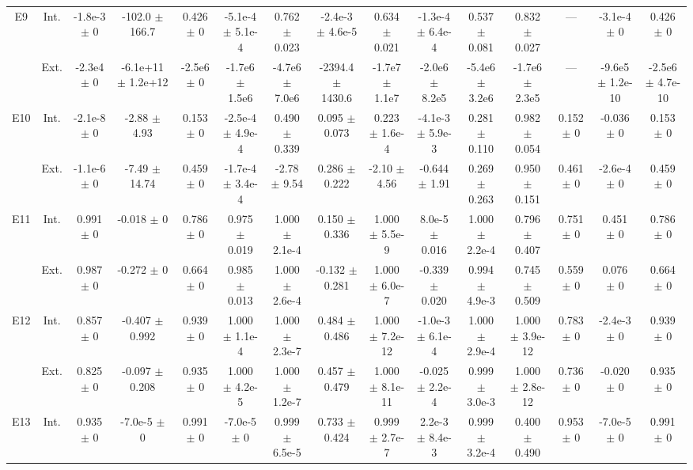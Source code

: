 \begin{table}[htbp]
{\begin{tabular}{@{}ccccccccccccccc@{}}
\cline{2-15}
\multirow{2}{*}{E9} & Int. & -1.8e-3 $\pm$ 0 & -102.0 $\pm$ 166.7 & 0.426 $\pm$ 0 & -5.1e-4 $\pm$ 5.1e-4 & 0.762 $\pm$ 0.023 & -2.4e-3 $\pm$ 4.6e-5 & 0.634 $\pm$ 0.021 & -1.3e-4 $\pm$ 6.4e-4 & 0.537 $\pm$ 0.081 & 0.832 $\pm$ 0.027 & --- & -3.1e-4 $\pm$ 0 & 0.426 $\pm$ 0 \\
 & Ext. & -2.3e4 $\pm$ 0 & -6.1e+11 $\pm$ 1.2e+12 & -2.5e6 $\pm$ 0 & -1.7e6 $\pm$ 1.5e6 & -4.7e6 $\pm$ 7.0e6 & -2394.4 $\pm$ 1430.6 & -1.7e7 $\pm$ 1.1e7 & -2.0e6 $\pm$ 8.2e5 & -5.4e6 $\pm$ 3.2e6 & -1.7e6 $\pm$ 2.3e5 & --- & -9.6e5 $\pm$ 1.2e-10 & -2.5e6 $\pm$ 4.7e-10 \\
\cline{2-15}
\multirow{2}{*}{E10} & Int. & -2.1e-8 $\pm$ 0 & -2.88 $\pm$ 4.93 & 0.153 $\pm$ 0 & -2.5e-4 $\pm$ 4.9e-4 & 0.490 $\pm$ 0.339 & 0.095 $\pm$ 0.073 & 0.223 $\pm$ 1.6e-4 & -4.1e-3 $\pm$ 5.9e-3 & 0.281 $\pm$ 0.110 & 0.982 $\pm$ 0.054 & 0.152 $\pm$ 0 & -0.036 $\pm$ 0 & 0.153 $\pm$ 0 \\
 & Ext. & -1.1e-6 $\pm$ 0 & -7.49 $\pm$ 14.74 & 0.459 $\pm$ 0 & -1.7e-4 $\pm$ 3.4e-4 & -2.78 $\pm$ 9.54 & 0.286 $\pm$ 0.222 & -2.10 $\pm$ 4.56 & -0.644 $\pm$ 1.91 & 0.269 $\pm$ 0.263 & 0.950 $\pm$ 0.151 & 0.461 $\pm$ 0 & -2.6e-4 $\pm$ 0 & 0.459 $\pm$ 0 \\
\cline{2-15}
\multirow{2}{*}{E11} & Int. & 0.991 $\pm$ 0 & -0.018 $\pm$ 0 & 0.786 $\pm$ 0 & 0.975 $\pm$ 0.019 & 1.000 $\pm$ 2.1e-4 & 0.150 $\pm$ 0.336 & 1.000 $\pm$ 5.5e-9 & 8.0e-5 $\pm$ 0.016 & 1.000 $\pm$ 2.2e-4 & 0.796 $\pm$ 0.407 & 0.751 $\pm$ 0 & 0.451 $\pm$ 0 & 0.786 $\pm$ 0 \\
 & Ext. & 0.987 $\pm$ 0 & -0.272 $\pm$ 0 & 0.664 $\pm$ 0 & 0.985 $\pm$ 0.013 & 1.000 $\pm$ 2.6e-4 & -0.132 $\pm$ 0.281 & 1.000 $\pm$ 6.0e-7 & -0.339 $\pm$ 0.020 & 0.994 $\pm$ 4.9e-3 & 0.745 $\pm$ 0.509 & 0.559 $\pm$ 0 & 0.076 $\pm$ 0 & 0.664 $\pm$ 0 \\
\cline{2-15}
\multirow{2}{*}{E12} & Int. & 0.857 $\pm$ 0 & -0.407 $\pm$ 0.992 & 0.939 $\pm$ 0 & 1.000 $\pm$ 1.1e-4 & 1.000 $\pm$ 2.3e-7 & 0.484 $\pm$ 0.486 & 1.000 $\pm$ 7.2e-12 & -1.0e-3 $\pm$ 6.1e-4 & 1.000 $\pm$ 2.9e-4 & 1.000 $\pm$ 3.9e-12 & 0.783 $\pm$ 0 & -2.4e-3 $\pm$ 0 & 0.939 $\pm$ 0 \\
 & Ext. & 0.825 $\pm$ 0 & -0.097 $\pm$ 0.208 & 0.935 $\pm$ 0 & 1.000 $\pm$ 4.2e-5 & 1.000 $\pm$ 1.2e-7 & 0.457 $\pm$ 0.479 & 1.000 $\pm$ 8.1e-11 & -0.025 $\pm$ 2.2e-4 & 0.999 $\pm$ 3.0e-3 & 1.000 $\pm$ 2.8e-12 & 0.736 $\pm$ 0 & -0.020 $\pm$ 0 & 0.935 $\pm$ 0 \\
\cline{2-15}
\multirow{2}{*}{E13} & Int. & 0.935 $\pm$ 0 & -7.0e-5 $\pm$ 0 & 0.991 $\pm$ 0 & -7.0e-5 $\pm$ 0 & 0.999 $\pm$ 6.5e-5 & 0.733 $\pm$ 0.424 & 0.999 $\pm$ 2.7e-7 & 2.2e-3 $\pm$ 8.4e-3 & 0.999 $\pm$ 3.2e-4 & 0.400 $\pm$ 0.490 & 0.953 $\pm$ 0 & -7.0e-5 $\pm$ 0 & 0.991 $\pm$ 0 \\

\end{tabular}}
\end{table}
